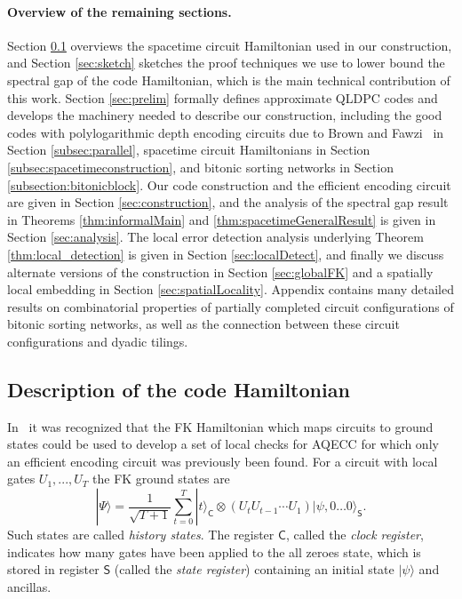 \documentclass[11pt,letterpaper]{article}
\theoremstyle{definition}
\theoremstyle{remark}
\numberwithin{equation}{section}
\let\origparagraph\paragraph
\renewcommand{\paragraph}[1]{\origparagraph{#1.}}
\theoremstyle{definition}
\newcommand{\ket}[1]{|#1\rangle}
\newcommand{\sC}{{\mathsf{C}}}
\newcommand{\sS}{{\mathsf{S}}}
\begin{document}
\paragraph{Overview of the remaining sections}  Section \ref{sec:codeHamSketch} overviews the spacetime circuit Hamiltonian used in our construction, and Section \ref{sec:sketch} sketches the proof techniques we use to lower bound the spectral gap of the code Hamiltonian, which is the main technical contribution of this work.   Section \ref{sec:prelim} formally defines approximate QLDPC codes and develops the machinery needed to describe our construction, including the good codes with polylogarithmic depth encoding circuits due to Brown and Fawzi~\cite{brown2013short} in Section \ref{subsec:parallel}, spacetime circuit Hamiltonians in Section \ref{subsec:spacetimeconstruction}, and bitonic sorting networks in Section \ref{subsection:bitonicblock}.  Our code construction and the efficient encoding circuit are given in Section \ref{sec:construction}, and the analysis of the spectral gap result in Theorems \ref{thm:informalMain} and \ref{thm:spacetimeGeneralResult} is given in Section \ref{sec:analysis}.   The local error detection analysis underlying Theorem \ref{thm:local_detection} is given in Section \ref{sec:localDetect}, and finally we discuss alternate versions of the construction in Section \ref{sec:globalFK} and a spatially local embedding in Section \ref{sec:spatialLocality}.  Appendix \label{appendix:bitonic} contains many detailed results on combinatorial properties of partially completed circuit configurations of bitonic sorting networks, as well as the connection between these circuit configurations and dyadic tilings.
%


%
%
%
%
%
%
%
%
%
%




%



%


%

\subsection{Description of the code Hamiltonian}\label{sec:codeHamSketch}
In~\cite{nirkhe_et_al:LIPIcs:2018:9095} it was recognized that the FK Hamiltonian which maps circuits to ground states could be used to develop a set of local checks for AQECC for which only an efficient encoding circuit was previously been found.  For a circuit with local gates $U_1,...,U_T$ the FK ground states are
\begin{equation}
  \ket{\Psi} = \frac{1}{\sqrt{T+1}} \sum_{t = 0}^T \ket{t}_{\sC} \otimes (U_t U_{t-1} \cdots U_1) \ket{\psi, 0 \ldots 0 }_{\sS}.\label{eq:historystate}
\end{equation}
Such states are called \emph{history states}.  The register $\sC$, called the \emph{clock register}, indicates how many gates have been applied to the all zeroes state, which is stored in register $\sS$ (called the \emph{state register}) containing an initial state $\ket{\psi}$ and ancillas. 
\end{document}
